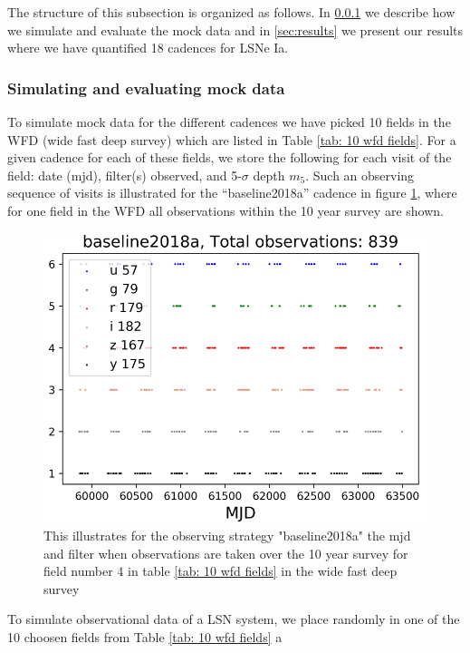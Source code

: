 The structure of this subsection is organized as follows. In
\ref{sec:simulation of mock data} we describe how we simulate and
evaluate the mock data and in \ref{sec:results} we present our results
where we have quantified 18 cadences for LSNe Ia.

\subsubsection{Simulating and evaluating mock data}
\label{sec:simulation of mock data}
To simulate mock data for the different cadences we have picked 10
fields in the WFD (wide fast deep survey) which are listed in Table
\ref{tab: 10 wfd fields}. For a given cadence for each of these
fields, we store the following for each visit of the field: date
(mjd), filter(s) observed, and 5-$\sigma$ depth $m_5$. Such an
observing sequence of visits is illustrated for the ``baseline2018a''
cadence in figure \ref{fig:observation patter LSST 10 year survey},
where for one field in the WFD all observations within the 10 year
survey are shown. 
%
\begin{figure}
\centering
\includegraphics[scale=0.7]{figures/sl_field_number3_baseline2018a_Daniel.pdf}
\caption{This illustrates for the observing strategy "baseline2018a" the mjd and filter when observations are taken over the 10 year survey for field number 4 in table \ref{tab: 10 wfd fields} in the wide fast deep survey}
\label{fig:observation patter LSST 10 year survey}
\end{figure}
%
To simulate observational data of a LSN system, we place randomly in
one of the 10 choosen fields from Table \ref{tab: 10 wfd fields} a
